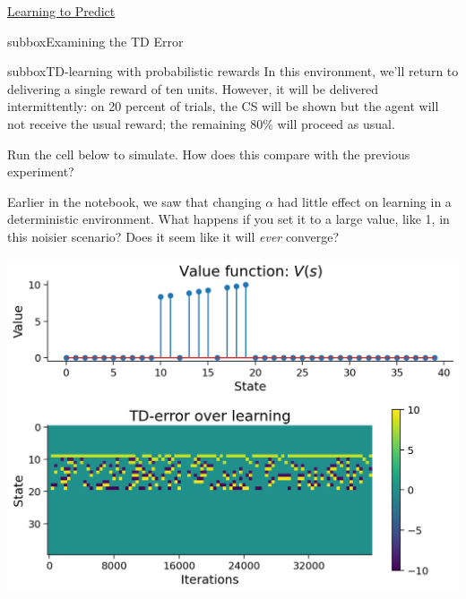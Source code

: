 \begin{textbox}{\href{https://compneuro.neuromatch.io/tutorials/W3D4_ReinforcementLearning/student/W3D4_Tutorial1.html}{Learning to Predict } }
\begin{subbox}{subbox}{Examining the TD Error}
\end{subbox}


\begin{subbox}{subbox}{TD-learning with probabilistic rewards}
\scriptsize
In this environment, we'll return to delivering a single reward of ten units. However, it will be delivered intermittently: on 20 percent of trials, the CS will be shown but the agent will not receive the usual reward; the remaining 80\% will proceed as usual.

 Run the cell below to simulate. How does this compare with the previous experiment?

Earlier in the notebook, we saw that changing $\alpha$ had little effect on learning in a deterministic environment. What happens if you set it to a large value, like 1, in this noisier scenario? Does it seem like it will \textit{ever} converge?
\begin{center}
    
\includegraphics[scale=0.2]{Figures/RL/RL_Figure6.png}
\end{center}

\end{subbox}
\end{textbox}
